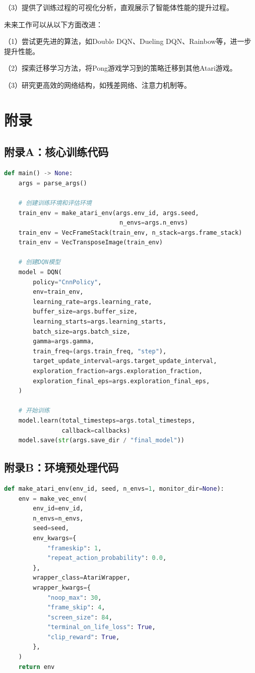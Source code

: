 \documentclass[12pt,a4paper]{article}
\begin{document}
（3）提供了训练过程的可视化分析，直观展示了智能体性能的提升过程。

未来工作可以从以下方面改进：

（1）尝试更先进的算法，如Double DQN、Dueling DQN、Rainbow等，进一步提升性能。

（2）探索迁移学习方法，将Pong游戏学习到的策略迁移到其他Atari游戏。

（3）研究更高效的网络结构，如残差网络、注意力机制等。

\newpage

\section*{附录}

\subsection*{附录A：核心训练代码}

\begin{lstlisting}[language=Python]
def main() -> None:
    args = parse_args()
    
    # 创建训练环境和评估环境
    train_env = make_atari_env(args.env_id, args.seed, 
                                n_envs=args.n_envs)
    train_env = VecFrameStack(train_env, n_stack=args.frame_stack)
    train_env = VecTransposeImage(train_env)
    
    # 创建DQN模型
    model = DQN(
        policy="CnnPolicy",
        env=train_env,
        learning_rate=args.learning_rate,
        buffer_size=args.buffer_size,
        learning_starts=args.learning_starts,
        batch_size=args.batch_size,
        gamma=args.gamma,
        train_freq=(args.train_freq, "step"),
        target_update_interval=args.target_update_interval,
        exploration_fraction=args.exploration_fraction,
        exploration_final_eps=args.exploration_final_eps,
    )
    
    # 开始训练
    model.learn(total_timesteps=args.total_timesteps, 
                callback=callbacks)
    model.save(str(args.save_dir / "final_model"))
\end{lstlisting}

\subsection*{附录B：环境预处理代码}

\begin{lstlisting}[language=Python]
def make_atari_env(env_id, seed, n_envs=1, monitor_dir=None):
    env = make_vec_env(
        env_id=env_id,
        n_envs=n_envs,
        seed=seed,
        env_kwargs={
            "frameskip": 1,
            "repeat_action_probability": 0.0,
        },
        wrapper_class=AtariWrapper,
        wrapper_kwargs={
            "noop_max": 30,
            "frame_skip": 4,
            "screen_size": 84,
            "terminal_on_life_loss": True,
            "clip_reward": True,
        },
    )
    return env
\end{lstlisting}
\end{document}
